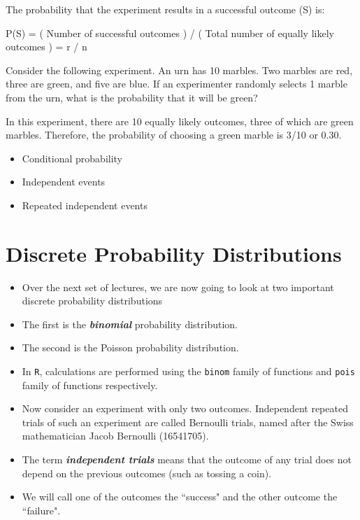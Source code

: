 \documentclass[12pt]{report}
\begin{document}
{{The probability that the experiment results in a successful outcome (S) is:

P(S) = ( Number of successful outcomes ) / ( Total number of equally likely outcomes ) = r / n

Consider the following experiment. An urn has 10 marbles. Two marbles are red, three are green, and five are blue. If an experimenter randomly selects 1 marble from the urn, what is the probability that it will be green?

In this experiment, there are 10 equally likely outcomes, three of which are green marbles. Therefore, the probability of choosing a green marble is 3/10 or 0.30.

\begin{itemize}
	\item Conditional probability
	\item Independent events
	\item Repeated independent events
\end{itemize}



\section{Discrete Probability Distributions}
{ \Large
	
	
	\begin{itemize}
		
		\item Over the next set of lectures, we are now going to look at two important discrete probability distributions
		
		\item The first is the \textbf{\emph{binomial}} probability distribution.
		
		\item The second is the Poisson probability distribution.
		
		\item In \texttt{R}, calculations are performed using the \texttt{binom} family of functions and \texttt{pois} family of functions respectively.
		
		\item Now consider an experiment with only two outcomes. Independent repeated trials of such an experiment are
		called Bernoulli trials, named after the Swiss mathematician Jacob Bernoulli (16541705). \item The term \textbf{\emph{independent
				trials}} means that the outcome of any trial does not depend on the previous outcomes (such as tossing a coin).
		\item We will call one of the outcomes the ``success" and the other outcome the ``failure".
		

\end{itemize}}}}
\end{document}
